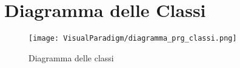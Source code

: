 \section{Diagramma delle Classi}
\label{sec:diagramma_delle_classi}

\begin{sidewaysfigure}[!ht]
  \centering
  \texttt{[image: VisualParadigm/diagramma\_prg\_classi.png]}
  \caption{Diagramma delle classi}
  \label{fig:prg_diagramma_classi}
\end{sidewaysfigure}

\clearpage
